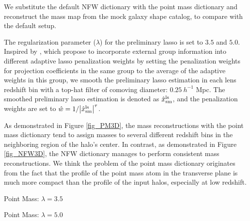 
We substitute the default NFW dictionary with the point mass dictionary and
reconstruct the mass map from the mock galaxy shape catalog, to compare with
the default setup.

The regularization parameter ($\lambda$) for the preliminary lasso is set to
$3.5$ and $5.0$.  Inspired by \citet{structureAdaLasso-Pramanik2020}, which
propose to incorporate external group information into different adaptive lasso
penalization weights by setting the penalization weights for projection
coefficients in the same group to the average of the adaptive weights in this
group, we smooth the preliminary lasso estimation in each lens redshift bin
with a top-hat filter of comoving diameter: $0.25~h^{-1}$ Mpc. The smoothed
preliminary lasso estimation is denoted as $\hat{x}^{\rm{ls}}_{\rm{sm}}$, and
the penalization weights are set to
$\hat{w}=1/\abs{\hat{x}^{\rm{ls}}_{\rm{sm}}}^\tau$.

As demonstrated in Figure \ref{fig_PM3D}, the mass reconstructions with the
point mass dictionary tend to assign masses to several different redshift bins
in the neighboring region of the halo's center.  In contrast, as demonstrated in
Figure \ref{fig_NFW3D}, the NFW dictionary manages to perform consistent mass
reconstructions.  We think the problem of the point mass dictionary originates
from the fact that the profile of the point mass atom in the transverse plane
is much more compact than the profile of the input halos, especially at low
redshift.

\begin{figure*}
\centering
\begin{minipage}[c]{1.0\columnwidth}
    \centering
    \small Point Mass: $\lambda=3.5$
\end{minipage}
\begin{minipage}[c]{1.0\columnwidth}
    \centering
    \small Point Mass: $\lambda=5.0$
\end{minipage}
\caption{The density maps reconstructed from the mock galaxy shape catalog with
    the point mass dictionary. The penalization parameters are $\lambda=3.5$
    (left) and $\lambda=5.0$ (right).  The input halo mass is
    $M_{200}=10^{15.02} ~h^{-1}M_{\odot}$, and its redshift is $z=0.164$.  The
    vertical direction is the line of sight direction. The boxes' lower
    boundaries and upper boundaries of correspond to $z=0.01$ and $z=0.85$,
    respectively.
    } \label{fig_PM3D}
\end{figure*}
